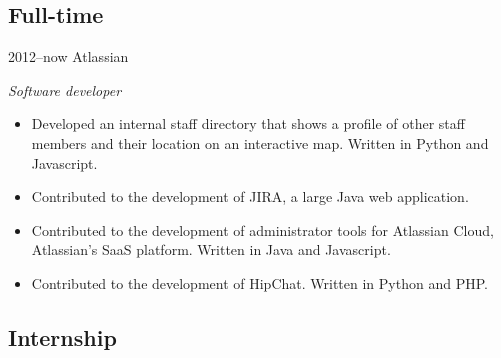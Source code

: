 \documentclass[]{friggeri-cv} %
\begin{document}
\subsection{Full-time}

\begin{entrylist}


\entry
{2012--now}
{Atlassian}
{}
{\emph{Software developer}
\begin{itemize}
\item Developed an internal staff directory that shows a profile of other staff members and their location on an interactive map. Written in Python and Javascript.
\item Contributed to the development of JIRA, a large Java web application.
\item Contributed to the development of administrator tools for Atlassian Cloud, Atlassian's SaaS platform. Written in Java and Javascript.
\item Contributed to the development of HipChat. Written in Python and PHP.
\end{itemize}}


\end{entrylist}

\subsection{Internship}
\end{document}
